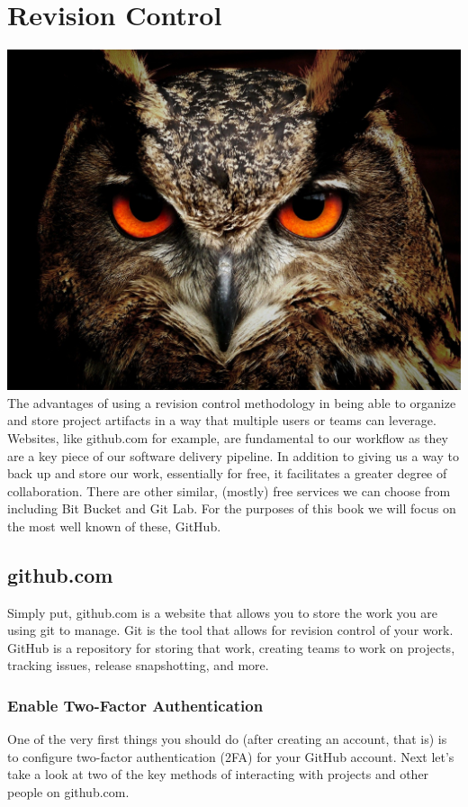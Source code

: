 \chapter{Revision Control}
\includegraphics[scale=0.20]{../images/owl-50267_1920.jpg}
\justify{}
The advantages of using a revision control methodology in being able to
organize and store project artifacts in a way that multiple users or
teams can leverage. Websites, like github.com for example, are
fundamental to our workflow as they are a key piece of our software
delivery pipeline.
\justify{}
In addition to giving us a way to back up and store our work,
essentially for free, it facilitates a greater degree of collaboration.
There are other similar, (mostly) free services we can choose from
including Bit Bucket and Git Lab. For the purposes of this book we will
focus on the most well known of these, GitHub.

\section{github.com}
\justify{}
Simply put, github.com is a website that allows you to store the work
you are using git to manage. Git is the tool that allows for revision
control of your work. GitHub is a repository for storing that work,
creating teams to work on projects, tracking issues, release
snapshotting, and more.
\subsection{Enable Two-Factor Authentication}
\justify{}
One of the very first things you should do (after creating an account,
that is) is to configure two-factor authentication (2FA) for your
GitHub account.
\justify{}
Next let's take a look at two of the key methods of interacting with
projects and other people on github.com.
